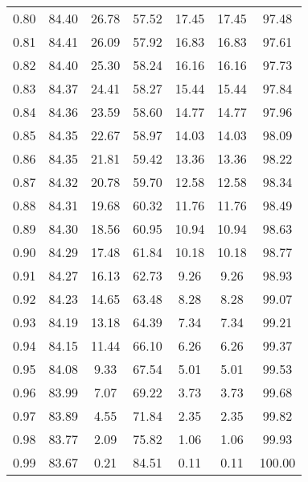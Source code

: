 \begin{tabular}{|c|c|c|c|c|c|c|}
      0.80 &     84.40 &     26.78 &      57.52 &   17.45 &      17.45 &         97.48 \\
      0.81 &     84.41 &     26.09 &      57.92 &   16.83 &      16.83 &         97.61 \\
      0.82 &     84.40 &     25.30 &      58.24 &   16.16 &      16.16 &         97.73 \\
      0.83 &     84.37 &     24.41 &      58.27 &   15.44 &      15.44 &         97.84 \\
      0.84 &     84.36 &     23.59 &      58.60 &   14.77 &      14.77 &         97.96 \\
      0.85 &     84.35 &     22.67 &      58.97 &   14.03 &      14.03 &         98.09 \\
      0.86 &     84.35 &     21.81 &      59.42 &   13.36 &      13.36 &         98.22 \\
      0.87 &     84.32 &     20.78 &      59.70 &   12.58 &      12.58 &         98.34 \\
      0.88 &     84.31 &     19.68 &      60.32 &   11.76 &      11.76 &         98.49 \\
      0.89 &     84.30 &     18.56 &      60.95 &   10.94 &      10.94 &         98.63 \\
      0.90 &     84.29 &     17.48 &      61.84 &   10.18 &      10.18 &         98.77 \\
      0.91 &     84.27 &     16.13 &      62.73 &    9.26 &       9.26 &         98.93 \\
      0.92 &     84.23 &     14.65 &      63.48 &    8.28 &       8.28 &         99.07 \\
      0.93 &     84.19 &     13.18 &      64.39 &    7.34 &       7.34 &         99.21 \\
      0.94 &     84.15 &     11.44 &      66.10 &    6.26 &       6.26 &         99.37 \\
      0.95 &     84.08 &      9.33 &      67.54 &    5.01 &       5.01 &         99.53 \\
      0.96 &     83.99 &      7.07 &      69.22 &    3.73 &       3.73 &         99.68 \\
      0.97 &     83.89 &      4.55 &      71.84 &    2.35 &       2.35 &         99.82 \\
      0.98 &     83.77 &      2.09 &      75.82 &    1.06 &       1.06 &         99.93 \\
      0.99 &     83.67 &      0.21 &      84.51 &    0.11 &       0.11 &        100.00 \\
\bottomrule
\end{tabular}
